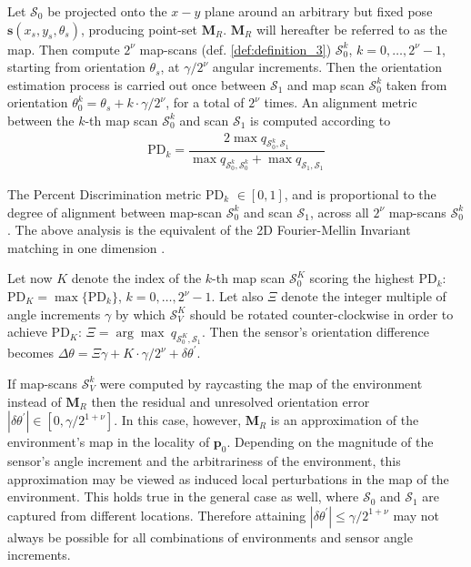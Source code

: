 Let $\mathcal{S}_0$ be projected onto the $x-y$ plane around an arbitrary but
fixed pose $\bm{s}(x_s, y_s, \theta_s)$, producing point-set $\bm{M}_R$.
$\bm{M}_R$ will hereafter be referred to as the map. Then compute $2^\nu$
map-scans (def. \ref{def:definition_3}) $\mathcal{S}_0^k$,
$k = 0,\dots,2^\nu-1$, starting from orientation $\theta_s$, at $\gamma / 2^\nu$
angular increments. Then the orientation estimation process is carried out once
between $\mathcal{S}_1$ and map scan $\mathcal{S}_0^k$ taken from orientation
$\theta_0^k = \theta_s + k \cdot \gamma / 2^\nu$, for a total of $2^\nu$ times.
An alignment metric between the $k$-th map scan $\mathcal{S}_0^k$ and scan
$\mathcal{S}_1$ is computed according to
\begin{align}
  \text{PD}_k = \dfrac{2 \max q_{\mathcal{S}_0^k,\mathcal{S}_1}}{\max q_{\mathcal{S}_0^k,\mathcal{S}_0^k} + \max q_{\mathcal{S}_1,\mathcal{S}_1}}
  \label{eq:pd}
\end{align}

The Percent Discrimination metric PD$_k$ $\in [0,1]$, and is proportional to
the degree of alignment between map-scan $\mathcal{S}_0^k$ and
scan $\mathcal{S}_1$, across all $2^\nu$ map-scans $\mathcal{S}_0^k$.
The above analysis is the equivalent of the 2D Fourier-Mellin Invariant
matching in one dimension \cite{fmt2d}.

Let now $K$ denote the index of the $k$-th map scan
$\mathcal{S}_0^K$ scoring the highest PD$_k$: $\text{PD}_K =
\max \{\text{PD}_k\}$, $k = 0,\dots,2^\nu-1$. Let also $\Xi$ denote the integer
multiple of angle increments $\gamma$ by which $\mathcal{S}_V^K$
should be rotated counter-clockwise in order to achieve PD$_K$:
$\Xi = \arg\max\ q_{\mathcal{S}_0^K, \mathcal{S}_1}$.  Then the sensor's
orientation difference becomes
$\Delta\theta = \Xi\gamma + K \cdot \gamma/2^\nu + \delta\theta^\prime$.

If map-scans $\mathcal{S}_V^k$ were computed by raycasting the map of the
environment instead of $\bm{M}_R$ then the residual and unresolved orientation
error $|\delta\theta^\prime| \in [0,\gamma / 2^{1+\nu}]$. In this case, however,
$\bm{M}_R$ is an approximation of the environment's map in the locality of
$\bm{p}_0$. Depending on the magnitude of the sensor's angle increment and
the arbitrariness of the environment, this approximation may be viewed as
induced local perturbations in the map of the environment. This holds true
in the general case as well, where $\mathcal{S}_0$ and $\mathcal{S}_1$ are
captured from different locations. Therefore attaining
$|\delta\theta^\prime| \leq \gamma / 2^{1+\nu}$ may not always be possible
for all combinations of environments and sensor angle increments.
